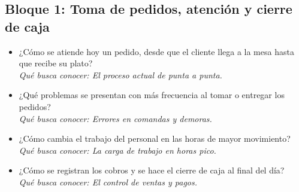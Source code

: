 \subsection{Bloque 1: Toma de pedidos, atención y cierre de caja}
\begin{itemize}
\item[\textbf{P2.}] ¿Cómo se atiende hoy un pedido, desde que el cliente llega a la mesa hasta que recibe su plato?\\
\emph{Qué busca conocer: El proceso actual de punta a punta.}
\item[\textbf{P3.}] ¿Qué problemas se presentan con más frecuencia al tomar o entregar los pedidos?\\
\emph{Qué busca conocer: Errores en comandas y demoras.}
\item[\textbf{P4.}] ¿Cómo cambia el trabajo del personal en las horas de mayor movimiento?\\
\emph{Qué busca conocer: La carga de trabajo en horas pico.}
\item[\textbf{P5.}] ¿Cómo se registran los cobros y se hace el cierre de caja al final del día?\\
\emph{Qué busca conocer: El control de ventas y pagos.}
\end{itemize}
